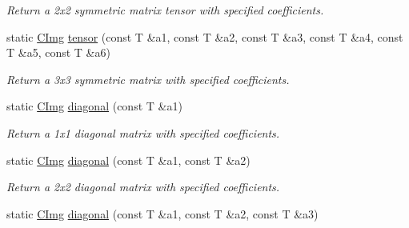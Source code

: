 \begin{DoxyCompactItemize}
\begin{DoxyCompactList}\small\item\em Return a 2x2 symmetric matrix tensor with specified coefficients. \item\end{DoxyCompactList}\item 
\hypertarget{structcimg__library_1_1_c_img_a9fdc9e8f92ac99e31d16b3a7a9de493f}{
static \hyperlink{structcimg__library_1_1_c_img}{CImg} \hyperlink{structcimg__library_1_1_c_img_a9fdc9e8f92ac99e31d16b3a7a9de493f}{tensor} (const T \&a1, const T \&a2, const T \&a3, const T \&a4, const T \&a5, const T \&a6)}
\label{structcimg__library_1_1_c_img_a9fdc9e8f92ac99e31d16b3a7a9de493f}

\begin{DoxyCompactList}\small\item\em Return a 3x3 symmetric matrix with specified coefficients. \item\end{DoxyCompactList}\item 
\hypertarget{structcimg__library_1_1_c_img_a7ccfe7f9a79817ddddc7fc7bbd526cec}{
static \hyperlink{structcimg__library_1_1_c_img}{CImg} \hyperlink{structcimg__library_1_1_c_img_a7ccfe7f9a79817ddddc7fc7bbd526cec}{diagonal} (const T \&a1)}
\label{structcimg__library_1_1_c_img_a7ccfe7f9a79817ddddc7fc7bbd526cec}

\begin{DoxyCompactList}\small\item\em Return a 1x1 diagonal matrix with specified coefficients. \item\end{DoxyCompactList}\item 
\hypertarget{structcimg__library_1_1_c_img_ad0dc88cea62137f97afb63848ab509ec}{
static \hyperlink{structcimg__library_1_1_c_img}{CImg} \hyperlink{structcimg__library_1_1_c_img_ad0dc88cea62137f97afb63848ab509ec}{diagonal} (const T \&a1, const T \&a2)}
\label{structcimg__library_1_1_c_img_ad0dc88cea62137f97afb63848ab509ec}

\begin{DoxyCompactList}\small\item\em Return a 2x2 diagonal matrix with specified coefficients. \item\end{DoxyCompactList}\item 
\hypertarget{structcimg__library_1_1_c_img_a4e2095835fcd73b4addf2a39ac4784a7}{
static \hyperlink{structcimg__library_1_1_c_img}{CImg} \hyperlink{structcimg__library_1_1_c_img_a4e2095835fcd73b4addf2a39ac4784a7}{diagonal} (const T \&a1, const T \&a2, const T \&a3)}
\label{structcimg__library_1_1_c_img_a4e2095835fcd73b4addf2a39ac4784a7}


\end{DoxyCompactItemize}
